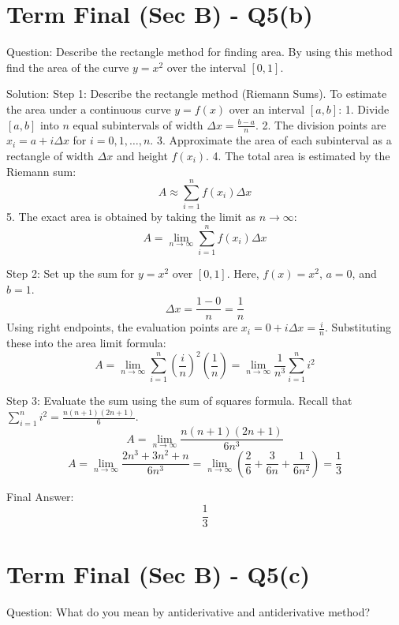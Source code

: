 \documentclass{article}
\begin{document}
\section*{Term Final (Sec B) - Q5(b)}
Question:
Describe the rectangle method for finding area. By using this method find the area of the curve $y = x^2$ over the interval $[0, 1]$.

Solution:
Step 1: Describe the rectangle method (Riemann Sums).
To estimate the area under a continuous curve $y = f(x)$ over an interval $[a, b]$:
1. Divide $[a, b]$ into $n$ equal subintervals of width $\Delta x = \frac{b-a}{n}$.
2. The division points are $x_i = a + i\Delta x$ for $i = 0, 1, \dots, n$.
3. Approximate the area of each subinterval as a rectangle of width $\Delta x$ and height $f(x_i)$.
4. The total area is estimated by the Riemann sum:
   \[
   A \approx \sum_{i=1}^n f(x_i) \Delta x
   \]
5. The exact area is obtained by taking the limit as $n \to \infty$:
   \[
   A = \lim_{n \to \infty} \sum_{i=1}^n f(x_i) \Delta x
   \]

Step 2: Set up the sum for $y = x^2$ over $[0, 1]$.
Here, $f(x) = x^2$, $a = 0$, and $b = 1$.
\[
\Delta x = \frac{1-0}{n} = \frac{1}{n}
\]
Using right endpoints, the evaluation points are $x_i = 0 + i \Delta x = \frac{i}{n}$.
Substituting these into the area limit formula:
\[
A = \lim_{n \to \infty} \sum_{i=1}^n \left(\frac{i}{n}\right)^2 \left(\frac{1}{n}\right) = \lim_{n \to \infty} \frac{1}{n^3} \sum_{i=1}^n i^2
\]

Step 3: Evaluate the sum using the sum of squares formula.
Recall that $\sum_{i=1}^n i^2 = \frac{n(n+1)(2n+1)}{6}$.
\[
A = \lim_{n \to \infty} \frac{n(n+1)(2n+1)}{6n^3}
\]
\[
A = \lim_{n \to \infty} \frac{2n^3 + 3n^2 + n}{6n^3} = \lim_{n \to \infty} \left( \frac{2}{6} + \frac{3}{6n} + \frac{1}{6n^2} \right) = \frac{1}{3}
\]

Final Answer:
\[
\boxed{\frac{1}{3}}
\]

\section*{Term Final (Sec B) - Q5(c)}
Question:
What do you mean by antiderivative and antiderivative method?
\end{document}

